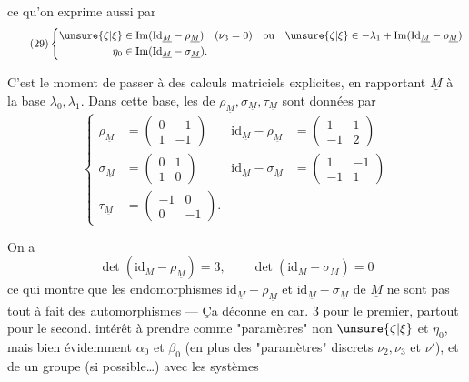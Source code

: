 
ce qu'on exprime aussi par
\[
\tag{29}
\left\{\begin{aligned}
\unsure{\zeta|\xi}&\in\operatorname{Im}(\mathrm{Id}_{\underline M}-\rho_{\underline M})
\quad(\nu_3=0)\quad\text{ou}\quad
\unsure{\zeta|\xi}\in-\lambda_1+\operatorname{Im}(\mathrm{Id}_{\underline M}-\rho_{\underline M})\\
\eta_0&\in\operatorname{Im}(\mathrm{Id}_{\underline M}-\sigma_{\underline M}).
\end{aligned}\right.
\]

C'est le moment de passer à des calculs
matriciels explicites, en rapportant $\underline M$ à
la base $\lambda_0,\lambda_1$. Dans cette base, les
 de $\rho_{\underline M},\sigma_{\underline M},\tau_{\underline M}$ sont données par
\[
\tag{30}
\left\{\begin{aligned}
\rho_{\underline M}&=\begin{pmatrix}0&-1\\1&-1\end{pmatrix}
&\mathrm{id}_{\underline M}-\rho_{\underline M}&=\begin{pmatrix}1&1\\-1&2\end{pmatrix}\\
\sigma_{\underline M}&=\begin{pmatrix}0&1\\1&0\end{pmatrix}
&\mathrm{id}_{\underline M}-\sigma_{\underline M}&=\begin{pmatrix}1&-1\\-1&1\end{pmatrix}\\
\tau_{\underline M}&=\begin{pmatrix}-1&0\\0&-1\end{pmatrix}.&&
\end{aligned}\right.
\]

On a
\[
\det(\mathrm{id}_{\underline M}-\rho_{\underline M})=3,
\qquad\det(\mathrm{id}_{\underline M}-\sigma_{\underline M})=0
\]
ce qui montre que  les endomorphismes
$\mathrm{id}_{\underline M}-\rho_{\underline M}$ et $\mathrm{id}_{\underline M}-\sigma_{\underline M}$ de $\underline M$ ne sont
pas tout à fait des automorphismes ---
Ça déconne en car. 3 pour le premier, \uline{partout}
 pour le second.
 intérêt à prendre comme "paramètres"
non $\unsure{\zeta|\xi}$ et $\eta_0$, mais bien évidemment
$\alpha_0$ et $\beta_0$ (en plus des "paramètres" discrets
$\nu_2,\nu_3$ et $\nu'$), et de   un
groupe (si possible\ldots) avec les systèmes

